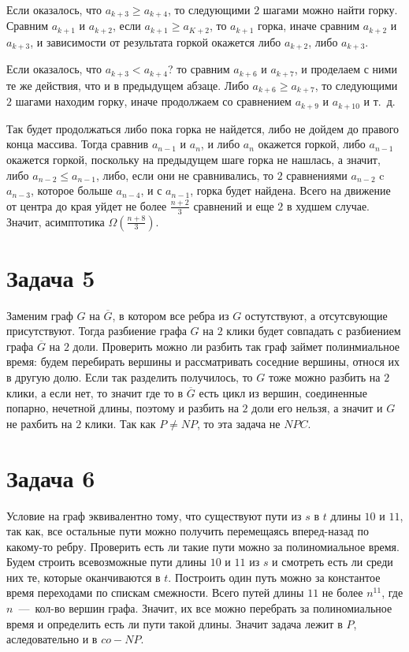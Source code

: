 \documentclass[a4paper,12pt]{article} %
\begin{document}
Если оказалось, что $a_{k+3}\geq a_{k+4}$, то следующими $2$ шагами можно найти горку. Сравним $a_{k+1}$ и $a_{k+2}$, если $a_{k+1}\geq a_{K+2}$, то $a_{k+1}$ горка, иначе сравним $a_{k+2}$ и $a_{k+3}$, и зависимости от результата горкой окажется либо $a_{k+2}$, либо $a_{k+3}$. 

Если оказалось, что $a_{k+3}< a_{k+4}$? то сравним $a_{k+6}$ и $a_{k+7}$, и проделаем с ними те же действия, что и в предыдущем абзаце. Либо $a_{k+6}\geq a_{k+7}$, то следующими $2$ шагами находим горку, иначе продолжаем со сравнением $a_{k+9}$ и $a_{k+10}$ и т.~д.

Так будет продолжаться либо пока горка не найдется, либо не дойдем до правого конца массива. Тогда сравнив $a_{n-1}$ и $a_n$, и либо $a_n$ окажется горкой, либо $a_{n-1}$ окажется горкой, поскольку на предыдущем шаге горка не нашлась, а значит, либо $a_{n-2}\leq a_{n-1}$, либо, если они не сравнивались, то $2$ сравнениями $a_{n-2}$ c $a_{n-3}$, которое больше $a_{n-4}$, и с $a_{n-1}$, горка будет найдена. Всего на движение от центра до края уйдет не более $\frac{n+2}{3}$ сравнений и еще $2$ в худшем случае. Значит, асимптотика $\Omega(\frac{n+8}{3})$.

\section{Задача 5}
\hspace{5mm}
Заменим граф $G$ на $\overline{G}$, в котором все ребра из $G$ остутствуют, а отсутсвующие присутствуют. Тогда разбиение графа $G$ на $2$ клики будет совпадать с разбиением графа $\overline{G}$ на $2$ доли. Проверить можно ли разбить так граф займет полинмиальное время: будем перебирать вершины и рассматривать соседние вершины, относя их в другую долю. Если так разделить получилось, то $G$ тоже можно разбить на $2$ клики, а если нет, то значит где то в $\overline{G}$ есть цикл из вершин, соединенные попарно, нечетной длины, поэтому и разбить на $2$ доли его нельзя, а значит и $G$ не рахбить на $2$ клики. Так как $P\neq NP$, то эта задача не $NPC$.

\section{Задача 6}
\hspace{5mm}
Условие на граф эквивалентно тому, что существуют пути из $s$ в $t$ длины $10$ и $11$, так как, все остальные пути можно получить перемещаясь вперед-назад по какому-то ребру. Проверить есть ли такие пути можно за полиномиальное время. Будем строить всевозможные пути длины $10$ и $11$ из $s$ и смотреть есть ли среди них те, которые оканчиваются в $t$. Построить один путь можно за константое время переходами по спискам смежности. Всего путей длины $11$ не более $n^11$, где $n$~---~кол-во вершин графа. Значит, их все можно перебрать за полиномиальное время и определить есть ли пути такой длины. Значит задача лежит в $P$, аследовательно и в $co-NP$.
\end{document}
